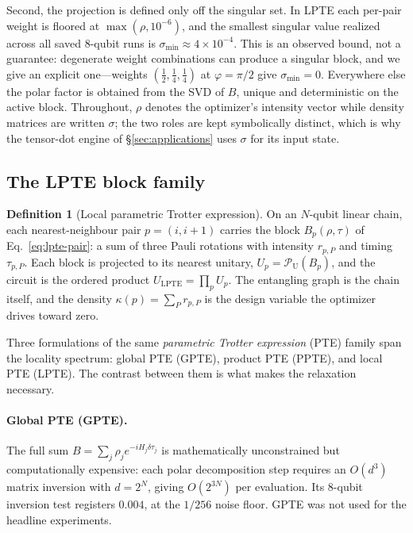 \documentclass[twocolumn,aps,prl,superscriptaddress,showkeys]{revtex4-2}
\theoremstyle{plain}
\theoremstyle{definition}
\newtheorem{definition}{Definition}
\begin{document}
Second, the projection is defined only off the singular set. In LPTE each per-pair weight is floored at $\max(\rho,10^{-6})$, and the smallest singular value realized across all saved 8-qubit runs is $\sigma_{\min}\approx4\times10^{-4}$. This is an observed bound, not a guarantee: degenerate weight combinations can produce a singular block, and we give an explicit one---weights $(\tfrac12,\tfrac14,\tfrac14)$ at $\varphi=\pi/2$ give $\sigma_{\min}=0$. Everywhere else the polar factor is obtained from the SVD of $B$, unique and deterministic on the active block. Throughout, $\rho$ denotes the optimizer's intensity vector while density matrices are written $\sigma$; the two roles are kept symbolically distinct, which is why the tensor-dot engine of \S\ref{sec:applications} uses $\sigma$ for its input state.

\subsection{The LPTE block family}

\begin{definition}[Local parametric Trotter expression]
\label{def:lpte}
On an $N$-qubit linear chain, each nearest-neighbour pair $p=(i,i{+}1)$ carries the block $B_p(\rho,\tau)$ of Eq.~\eqref{eq:lpte-pair}: a sum of three Pauli rotations with intensity $r_{p,P}$ and timing $\tau_{p,P}$. Each block is projected to its nearest unitary, $U_p=\mathcal P_{\mathrm U}(B_p)$, and the circuit is the ordered product $U_{\mathrm{LPTE}}=\prod_p U_p$. The entangling graph is the chain itself, and the density $\kappa(p)=\sum_P r_{p,P}$ is the design variable the optimizer drives toward zero.
\end{definition}

Three formulations of the same \emph{parametric Trotter expression} (PTE) family span the locality spectrum: global PTE (GPTE), product PTE (PPTE), and local PTE (LPTE). The contrast between them is what makes the relaxation necessary.

\paragraph{Global PTE (GPTE).}
The full sum $B=\sum_j\rho_j e^{-iH_j\delta\tau_j}$ is mathematically unconstrained but computationally expensive: each polar decomposition step requires an $O(d^3)$ matrix inversion with $d=2^N$, giving $O(2^{3N})$ per evaluation. Its 8-qubit inversion test registers $0.004$, at the $1/256$ noise floor. GPTE was not used for the headline experiments.
\end{document}
